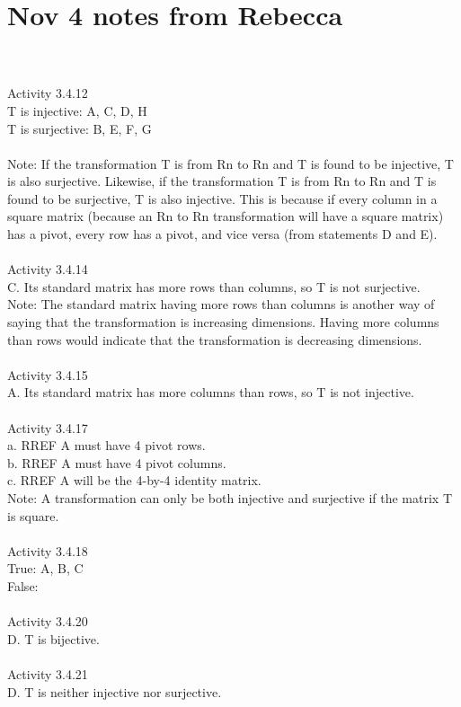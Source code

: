 \documentclass{article}
\begin{document}
\section*{Nov 4 notes from Rebecca }\\
\\
Activity 3.4.12\\
T is injective: A, C, D, H \\
T is surjective: B, E, F, G \\
\\
Note: If the transformation T is from Rn to Rn and T is found to be injective, T is also surjective. Likewise, if the transformation T is from Rn to Rn and T is found to be surjective, T is also injective. This is because if every column in a square matrix (because an  Rn to Rn transformation will have a square matrix) has a pivot, every row has a pivot, and vice versa (from statements D and E). \\
\\
Activity 3.4.14\\
C. Its standard matrix has more rows than columns, so T is not surjective. \\
Note: The standard matrix having more rows than columns is another way of saying that the transformation is increasing dimensions. Having more columns than rows would indicate that the transformation is decreasing dimensions. \\
\\
Activity 3.4.15\\
A. Its standard matrix has more columns than rows, so T is not injective. \\
\\
Activity 3.4.17\\
a. RREF A must have 4 pivot rows. \\
b. RREF A must have 4 pivot columns. \\
c. RREF A will be the 4-by-4 identity matrix. \\
Note: A transformation can only be both injective and surjective if the matrix T is square. \\
\\
Activity 3.4.18\\
True: A, B, C\\
False:\\
\\
Activity 3.4.20\\
D. T is bijective.\\ 
\\
Activity 3.4.21\\
D. T is neither injective nor surjective. \\
\\
\end{document}
